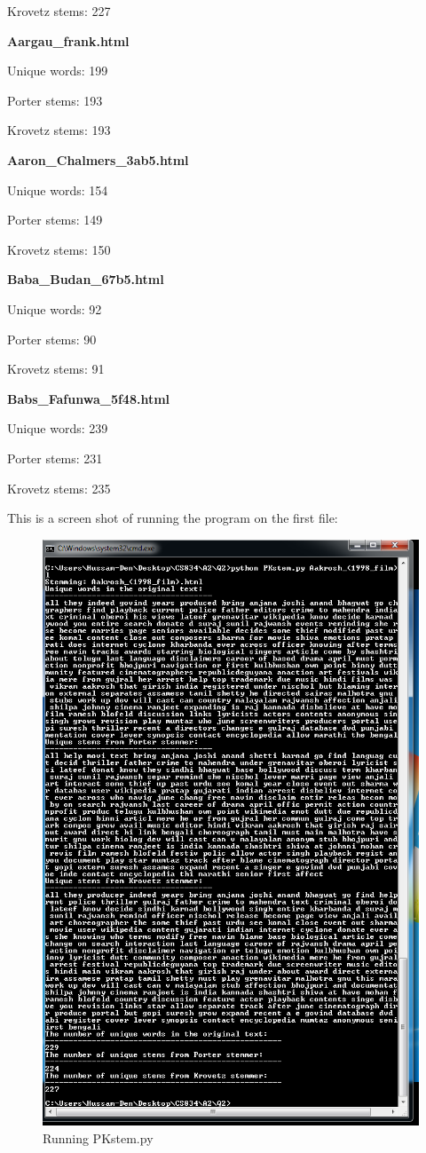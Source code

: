 \documentclass[a4paper, 11pt]{article}
\begin{document}
Krovetz stems: 227
 
\textbf{Aargau\_frank.html}

Unique words: 199

Porter stems: 193

Krovetz stems: 193

\textbf{Aaron\_Chalmers\_3ab5.html}

Unique words: 154

Porter stems: 149

Krovetz stems: 150

\textbf{Baba\_Budan\_67b5.html}

Unique words: 92

Porter stems: 90

Krovetz stems: 91

\textbf{Babs\_Fafunwa\_5f48.html}

Unique words: 239

Porter stems: 231

Krovetz stems: 235

This is a screen shot of running the program on the first file:



\begin{figure}[h]
\caption{Running PKstem.py}
\centering
\includegraphics[scale=0.64]{Q2/PKstem.png}
\end{figure}
\end{document}
